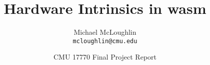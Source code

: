 \documentclass[final]{article}
\newcommand{\wasml}{\acl{wasm}\xspace}
\begin{document}
\title{Hardware Intrinsics in \wasml}
\author{Michael McLoughlin \\ \texttt{mcloughlin@cmu.edu}}
\date{CMU 17770 Final Project Report}
\maketitle

\setcounter{tocdepth}{2}
\tableofcontents









\appendix


\printbibliography
\end{document}
